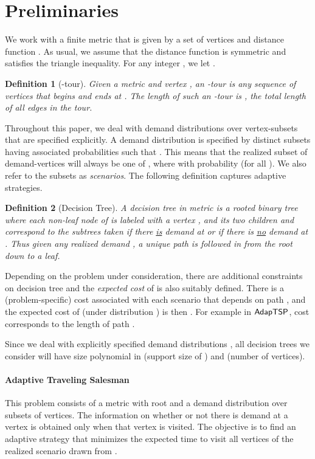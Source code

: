 \documentclass[11pt]{article}
\newtheorem{definition}{Definition}
\def\stsp{\ensuremath{{\sf AdapTSP}}\xspace}
\begin{document}
\section{Preliminaries}\label{sec:prelim}
We work with a  finite metric  that is given by a set  of  vertices and distance function . 
As usual, we assume that the distance function is symmetric and satisfies the triangle inequality. For any
integer , we let .


\begin{definition}[-tour]
Given a metric  and vertex , an \emph{-tour} is any sequence  of vertices that  begins and ends at . The length of such an -tour is , the total length of all edges in the tour. 
\end{definition}


Throughout this paper, we deal with demand distributions over vertex-subsets that are specified explicitly. A demand
distribution  is specified by  distinct subsets  having associated probabilities
 such that . This means that the realized subset  of demand-vertices will
always be one of , where  with probability  (for all ). We also refer to the
subsets  as {\em scenarios}. The following definition captures adaptive strategies.

\smallskip
\begin{definition}[Decision Tree]
  \label{def:dt}
  A decision tree  in metric  is a
  rooted binary tree where each non-leaf node of  is labeled with a vertex ,
    and its two children  and  correspond to the
    subtrees taken if there \underline{is} demand at  or if there is \underline{no} demand at .
Thus given any realized demand , a unique path  is followed in  from the root down to a leaf.
\end{definition}
Depending on the problem under consideration, there are additional constraints on decision tree  and the
\emph{expected cost} of  is also suitably defined.  There is a (problem-specific) cost  associated with each
scenario  that depends on path , and the expected cost of  (under distribution ) is then
. For example in \stsp, cost  corresponds to the length of path . 


\smallskip

Since we deal with explicitly specified demand distributions , all decision trees we consider will have size polynomial in  (support size of ) and  (number of vertices). 





\paragraph{Adaptive Traveling Salesman}
This problem consists of a metric  with root  and a demand distribution  over subsets of
vertices. The  information on whether or not there is demand at a vertex  is
obtained only when that vertex  is visited. The objective is to find an adaptive strategy that minimizes the expected
time to visit all vertices of the realized scenario drawn from .
\end{document}
